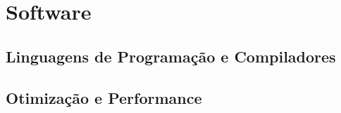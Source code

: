\chapter{Software}
\label{chap:software}

\section{Linguagens de Programação e Compiladores}
\label{sec:linguagens-de-programacao-e-compiladores}

\lipsum[1-2]

\section{Otimização e Performance}
\label{sec:otimizacao-e-performance}

\lipsum[1-2]
